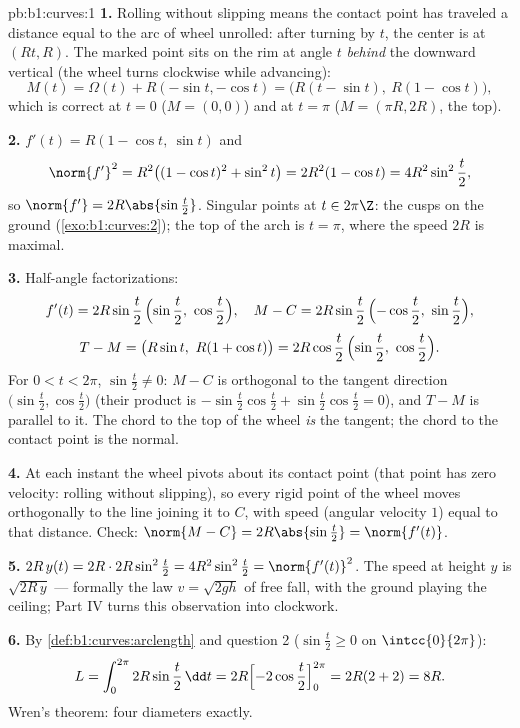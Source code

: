 \begin{solution}{pb:b1:curves:1}
\textbf{1.} Rolling without slipping means the contact point has
traveled a distance equal to the arc of wheel unrolled: after
turning by $t$, the center is at $(Rt, R)$. The marked point sits
on the rim at angle $t$ \emph{behind} the downward vertical
(the wheel turns clockwise while advancing):
\[
M(t) = \Omega(t) + R(-\sin t, -\cos t)
= \bigl(R(t - \sin t),\ R(1 - \cos t)\bigr),
\]
which is correct at $t = 0$ ($M = (0,0)$) and at $t = \pi$ ($M =
(\pi R, 2R)$, the top).

\textbf{2.} $f'(t) = R(1 - \cos t,\ \sin t)$ and
\[
\norm{f'}^2 = R^2\bigl((1-\cos t)^2 + \sin^2 t\bigr)
= 2R^2(1 - \cos t) = 4R^2\sin^2\frac t2 ,
\]
so $\norm{f'} = 2R\abs{\sin\frac t2}$. Singular points at $t \in
2\pi\Z$: the cusps on the ground (\cref{exo:b1:curves:2}); the
top of the arch is $t = \pi$, where the speed $2R$ is maximal.

\textbf{3.} Half-angle factorizations:
\[
f'(t) = 2R\sin\frac t2\,\Bigl(\sin\frac t2,\ \cos\frac t2\Bigr),
\quad
M - C = 2R\sin\frac t2\,\Bigl(-\cos\frac t2,\ \sin\frac t2\Bigr),
\]
\[
T - M = \bigl(R\sin t,\ R(1 + \cos t)\bigr)
= 2R\cos\frac t2\,\Bigl(\sin\frac t2,\ \cos\frac t2\Bigr).
\]
For $0 < t < 2\pi$, $\sin\frac t2 \neq 0$: $M - C$ is orthogonal
to the tangent direction $\bigl(\sin\frac t2, \cos\frac
t2\bigr)$ (their product is $-\sin\frac t2\cos\frac t2 +
\sin\frac t2\cos\frac t2 = 0$), and $T - M$ is parallel to it.
The chord to the top of the wheel \emph{is} the tangent; the
chord to the contact point is the normal.

\textbf{4.} At each instant the wheel pivots about its contact
point (that point has zero velocity: rolling without slipping),
so every rigid point of the wheel moves orthogonally to the line
joining it to $C$, with speed (angular velocity $1$) equal to
that distance. Check: $\norm{M - C} = 2R\abs{\sin\frac t2} =
\norm{f'(t)}$.

\textbf{5.} $2R\,y(t) = 2R\cdot 2R\sin^2\frac t2 =
4R^2\sin^2\frac t2 = \norm{f'(t)}^2$. The speed at height $y$ is
$\sqrt{2R\,y}$ --- formally the law $v = \sqrt{2gh}$ of free
fall, with the ground playing the ceiling; Part IV turns this
observation into clockwork.

\textbf{6.} By \cref{def:b1:curves:arclength} and question 2
($\sin\frac t2 \geq 0$ on $\intcc{0}{2\pi}$):
\[
L = \int_0^{2\pi} 2R\sin\frac t2\,\dd t
= 2R\Bigl[-2\cos\frac t2\Bigr]_0^{2\pi} = 2R(2 + 2) = 8R .
\]
Wren's theorem: four diameters exactly.


\end{solution}
